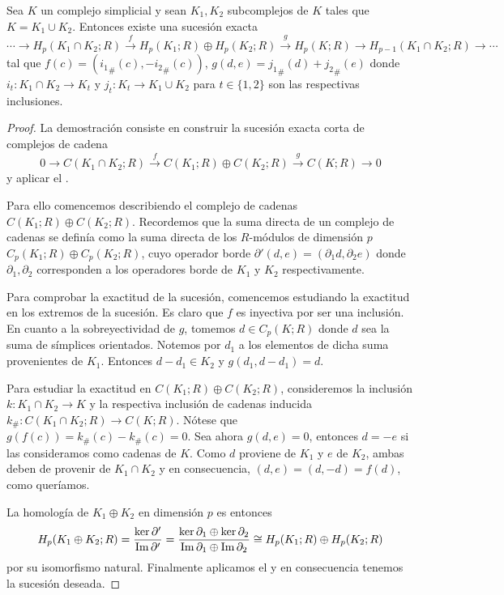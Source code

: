 \begin{proposicion}
	Sea $K$ un complejo simplicial y sean $K_1,K_2$ subcomplejos de $K$ tales que $K = K_1 \cup K_2$. Entonces existe una sucesión exacta
	\[
		\cdots \to H_p(K_1 \cap K_2;R) \overset{f}{\to} H_p(K_1;R) \oplus H_p(K_2;R) \overset{g}{\to} H_p(K;R) \to H_{p-1}(K_1 \cap K_2;R) \to \cdots
	\]
	tal que $f(c) = ({i_1}_\#(c),-{i_2}_\#(c))$, $g(d,e) = {j_1}_\#(d)+{j_2}_\#(e)$ donde $i_t: K_1 \cap K_2 \to K_t$ y $j_t: K_t \to K_1 \cup K_2$ para $t \in \{1,2\}$ son las respectivas inclusiones.
\end{proposicion}
\begin{proof}
	La demostración consiste en construir la sucesión exacta corta de complejos de cadena
	\[
		0 \to C(K_1 \cap K_2;R) \overset{f}{\to} C(K_1;R) \oplus C(K_2;R) \overset{g}{\to} C(K;R) \to 0
	\]
	y aplicar el .
	
	Para ello comencemos describiendo el complejo de cadenas $C(K_1;R) \oplus C(K_2;R)$. Recordemos que la suma directa de un complejo de cadenas se definía como la suma directa de los $R$-módulos de dimensión $p$ $C_p(K_1;R) \oplus C_p(K_2;R)$, cuyo operador borde $\partial'(d,e) = (\partial_1d, \partial_2 e)$ donde $\partial_1, \partial_2$ corresponden a los operadores borde de $K_1$ y $K_2$ respectivamente.
	
	Para comprobar la exactitud de la sucesión,  comencemos estudiando la exactitud en los extremos de la sucesión. Es claro que $f$ es inyectiva por ser una inclusión. En cuanto a la sobreyectividad de $g$, tomemos $d \in C_p(K;R)$ donde $d$ sea la suma de símplices orientados. Notemos por $d_1$ a los elementos de dicha suma provenientes de $K_1$. Entonces $d - d_1 \in K_2$ y $g(d_1, d-d_1) = d$.
	
	Para estudiar la exactitud en $C(K_1;R) \oplus C(K_2;R)$, consideremos la inclusión $k: K_1 \cap K_2 \to K$ y la respectiva inclusión de cadenas inducida $k_\#: C(K_1 \cap K_2;R) \to C(K;R)$. Nótese que $g(f(c)) = k_\#(c) - k_\#(c) = 0$. Sea ahora $g(d,e) = 0$, entonces $d = -e$ si las consideramos como cadenas de $K$. Como $d$ proviene de $K_1$ y $e$ de $K_2$, ambas deben de provenir de $K_1 \cap K_2$ y en consecuencia, $(d,e) = (d,-d) = f(d)$, como queríamos.
	
	La homología de $K_1 \oplus K_2$ en dimensión $p$ es entonces
	\[
		H_p(K_1 \oplus K_2;R) = \frac{\ker \partial'}{\operatorname{Im} \partial'} = \frac{\ker \partial_1 \oplus \ker \partial_2}{\operatorname{Im} \partial_1 \oplus \operatorname{Im} \partial_2} \cong H_p(K_1;R) \oplus H_p(K_2;R)
	\]
	por su isomorfismo natural. Finalmente aplicamos el  y en consecuencia tenemos la sucesión deseada.
	

\end{proof}
